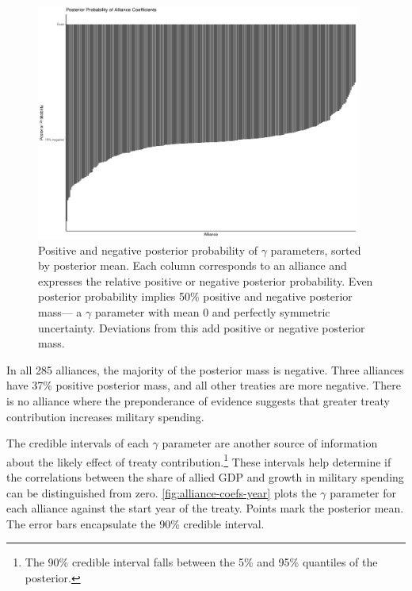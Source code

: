 \documentclass[12pt]{article}
\begin{document}
\begin{figure}[htbp]
	\centering
		\includegraphics[width=0.95\textwidth]{full-post-prob.pdf}
	\caption{Positive and negative posterior probability of $\gamma$ parameters, sorted by posterior mean. Each column corresponds to an alliance and expresses the relative positive or negative posterior probability. Even posterior probability implies 50\% positive and negative posterior mass--- a $\gamma$ parameter with mean 0 and perfectly symmetric uncertainty. Deviations from this add positive or negative posterior mass.}
	\label{fig:full-post-prob}
\end{figure}


In all 285 alliances, the majority of the posterior mass is negative.  
Three alliances have 37\% positive posterior mass, and all other treaties are more negative. 
There is no alliance where the preponderance of evidence suggests that greater treaty contribution increases military spending. 


The credible intervals of each $\gamma$ parameter are another source of information about the likely effect of treaty contribution.\footnote{The 90\% credible interval falls between the 5\% and 95\% quantiles of the posterior.} 
These intervals help determine if the correlations between the share of allied GDP and growth in military spending can be distinguished from zero. 
\autoref{fig:alliance-coefs-year} plots the $\gamma$ parameter for each alliance against the start year of the treaty.
Points mark the posterior mean. 
The error bars encapsulate the 90\% credible interval.
\end{document}
